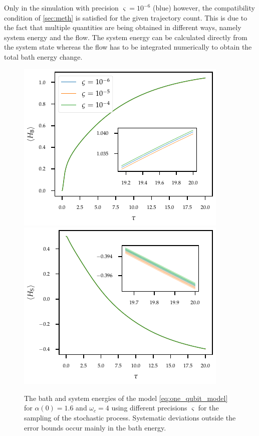 Only in the simulation with precision \(\varsigma=10^{-6}\) (blue)
however, the compatibility condition of \cref{sec:meth} is satisfied
for the given trajectory count. This is due to the fact that multiple
quantities are being obtained in different ways, namely system energy
and the flow. The system energy can be calculated directly from the
system state whereas the flow has to be integrated numerically to
obtain the total bath energy change.
\begin{figure}[htp]
  \centering
  \includegraphics{figs/one_bath_syst/stocproc_systematics_bath_energy}
  \includegraphics{figs/one_bath_syst/stocproc_systematics_system}
  \caption{\label{fig:stocproc_bath_sys}The bath and system energies of the
    model \cref{eq:one_qubit_model} for \(α(0)=1.6\) and \(ω_c=4\)
    using different precisions \(\varsigma\) for the sampling of the
    stochastic process. Systematic deviations outside the error bounds
  occur mainly in the bath energy.}
\end{figure}

